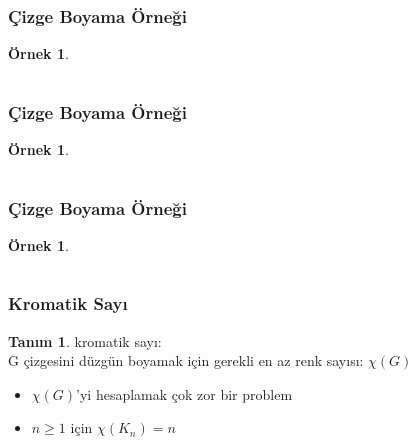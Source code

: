 \documentclass[dvipsnames]{beamer}
\theoremstyle{definition}
\newtheorem{tanim}[theorem]{Tanım}
\theoremstyle{example}
\newtheorem{ornek}[theorem]{Örnek}
\theoremstyle{plain}
\begin{document}
\begin{frame}
  \frametitle{Çizge Boyama Örneği}

  \begin{ornek}
    \begin{columns}
      \begin{center}
      \end{center}

      \begin{center}
      \end{center}
    \end{columns}
  \end{ornek}
\end{frame}

\begin{frame}
  \frametitle{Çizge Boyama Örneği}

  \begin{ornek}
    \begin{columns}
      \begin{center}
      \end{center}

      \begin{center}
      \end{center}
    \end{columns}
  \end{ornek}
\end{frame}

\begin{frame}
  \frametitle{Çizge Boyama Örneği}

  \begin{ornek}
    \begin{columns}
      \begin{center}
      \end{center}

      \begin{center}
      \end{center}
    \end{columns}
  \end{ornek}
\end{frame}

\begin{frame}
  \frametitle{Kromatik Sayı}

  \begin{tanim}
    \alert{kromatik sayı}:\\
      G çizgesini düzgün boyamak için gerekli en az renk sayısı: $\chi (G)$
  \end{tanim}

  \pause
  \begin{itemize}
     \item $\chi (G)$'yi hesaplamak çok zor bir problem
     \item $n \geq 1$ için $\chi (K_n) = n$
  \end{itemize}
\end{frame}
\end{document}
